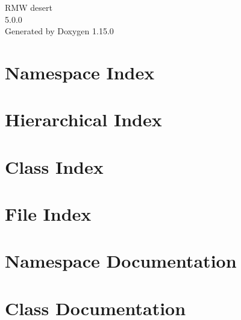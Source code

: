 \documentclass[twoside]{book}
\newcommand{\+}{\discretionary{\mbox{\scriptsize$\hookleftarrow$}}{}{}}
\newcommand{\clearemptydoublepage}{%
    \newpage{\pagestyle{empty}\cleardoublepage}%
  }
\begin{document}
  \raggedbottom
    \hypersetup{pageanchor=false,
                bookmarksnumbered=true,
                pdfencoding=unicode
               }
  \begin{titlepage}
  \vspace*{7cm}
  \begin{center}%
  {\Large RMW desert}\\
  [1ex]\large 5.\+0.\+0 \\
  \vspace*{1cm}
  {\large Generated by Doxygen 1.15.0}\\
  \end{center}
  \end{titlepage}
  \clearemptydoublepage
  \tableofcontents
  \clearemptydoublepage
  \hypersetup{pageanchor=true}
\chapter{Namespace Index}

\chapter{Hierarchical Index}

\chapter{Class Index}

\chapter{File Index}

\chapter{Namespace Documentation}



\chapter{Class Documentation}



















\end{document}
